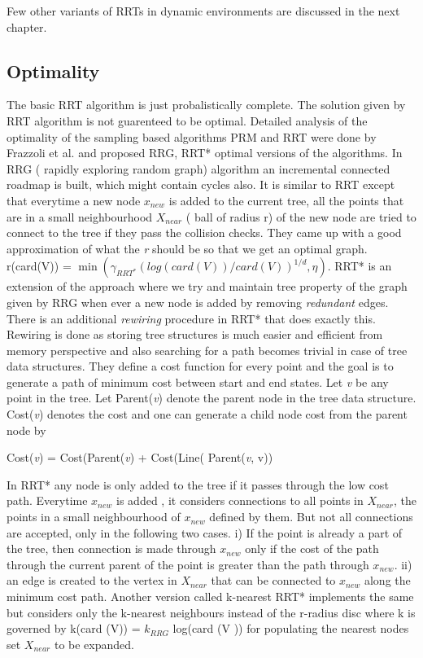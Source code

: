 \documentclass[MTech]{iitmdiss}
\begin{document}
Few other variants of RRTs in dynamic environments are discussed in the next chapter.

 \subsection{Optimality}
 The basic RRT algorithm is just probalistically complete. The solution given by RRT algorithm is not guarenteed to be optimal. Detailed analysis of the optimality of the sampling based algorithms PRM and RRT were done by Frazzoli  et al. 
\cite{karaman11}
 and proposed  RRG, RRT* optimal versions of the algorithms.
  In RRG ( rapidly exploring random graph) algorithm an incremental connected roadmap is built, which might contain cycles also. It is similar to RRT except that everytime a new node $x_{new}$ is added to the current tree, all the points that are in a small neighbourhood $X_{near}$ ( ball of radius r) of the new node are tried to connect to the tree if they pass the collision checks. 
 They came up with a good approximation of what the \emph{r} should be so that we get an optimal graph. r(card(V)) = $\min(\gamma_{RRT^*} (log(card(V))/card(V))^{1/d}  , \eta   )$.   RRT* is an extension of the approach where we try and maintain tree property of the graph given by RRG when ever a new node is added by removing \emph{redundant} edges. There is an additional \emph{rewiring} procedure in RRT*  that does exactly this. Rewiring is done as storing tree structures is much easier and efficient from memory perspective and also searching for a path becomes trivial in case of tree data structures. They define a cost function for every point and the goal is to generate a path of minimum cost between start and end states. Let \textit{v} be any point in the tree. Let Parent(\textit{v}) denote the parent node in the tree data structure.  Cost(\textit{v}) denotes the cost and one can generate a child node cost from the parent node by 

Cost(\textit{v}) = Cost(Parent(\textit{v}) +  Cost(Line( Parent(\textit{v}, v)) 

In RRT* any node is only added to the tree if it passes through the low cost path. Everytime $x_{new}$ is added , it considers connections to all points in $X_{near}$, the points in a small neighbourhood of $x_{new}$ defined by them. But not all connections are accepted, only in the following two cases. i) If the point is already a part of the tree, then connection is made through $x_{new}$ only if the cost of the path through the current parent of the point is greater than the path through $x_{new}$.  ii) an edge is created to the vertex in $X_{near}$ that can be connected to $x_{new }$ along the minimum cost path. Another version called k-nearest RRT* implements the same but considers only the k-nearest neighbours instead of the r-radius disc where k is governed by k(card (V)) = $k_{RRG}$ log(card (V )) for populating the nearest nodes set $X_{near}$ to be expanded.
 
\end{document}
